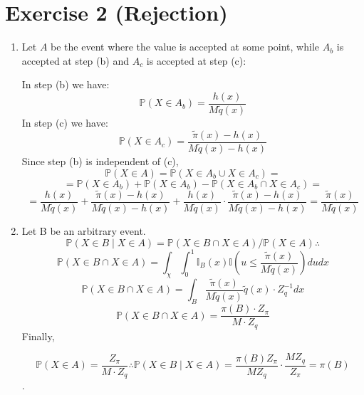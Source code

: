 \documentclass[12pt,letterpaper]{article}
\begin{document}
\section*{Exercise 2 (Rejection)}
\begin{enumerate}[leftmargin=!,labelindent=5pt]

	\item Let $A$ be the event where the value is accepted at some point,
	while $A_b$ is accepted at step (b) and $A_c$ is accepted at step (c):

	In step (b) we have:
	$$\mathbb{P}(X \in A_b)
	= \frac{h(x)}{M\tilde{q}(x)}$$
	In step (c) we have:
	$$\mathbb{P}(X \in A_c)
	= \frac{\tilde{\pi}(x) - h(x)}{M\tilde{q}(x) - h(x)}$$
	Since step (b) is independent of (c),
	$$\mathbb{P}(X \in A) = \mathbb{P}(X \in A_b \cup X \in A_c) =$$
	$$= \mathbb{P}(X\in A_b)+\mathbb{P}(X\in A_b)-
	\mathbb{P}(X \in A_b \cap X \in A_c) = $$
	$$ = \frac{h(x)}{M\tilde{q}(x)} +
	\frac{\tilde{\pi}(x) - h(x)}{M\tilde{q}(x) - h(x)} + 
	\frac{h(x)}{M\tilde{q}(x)}\cdot
	\frac{\tilde{\pi}(x) - h(x)}{M\tilde{q}(x) - h(x)} =
	\frac{\tilde{\pi}(x)}{M\tilde{q}(x)}
	$$

	\item Let B be an arbitrary event.
	$$\mathbb{P}(X \in B \mid X \in A) =
	\mathbb{P}(X \in B \cap X \in A) / \mathbb{P}(X \in A) \therefore$$
	$$ \mathbb{P}(X \in B \cap X \in A) =
	\int_{\chi}\int_{0}^{1}
	\mathbb{I}_B(x)\mathbb{I}
	\left( u \leq \frac{\tilde{\pi}(x)}{M\tilde{q}(x)} \right) du dx$$
	$$ \mathbb{P}(X \in B \cap X \in A) =
	\int_{B}
	\frac{\tilde{\pi}(x)}{M\tilde{q}(x)}\tilde{q}(x)\cdot Z_q^{-1} dx$$
	$$ \mathbb{P}(X \in B \cap X \in A) =
	\frac{\pi(B)\cdot Z_\pi}{M \cdot Z_q}
	$$
	Finally,

	$$\mathbb{P}(X \in A) = \frac{Z_\pi}{M\cdot Z_q} \therefore 
	\mathbb{P}(X \in B \mid X \in A) =
	\frac{\pi(B) Z_\pi}{M Z_q}\cdot \frac{M Z_q}{Z_\pi} = \pi(B)$$.


\end{enumerate}
        
\end{document}
